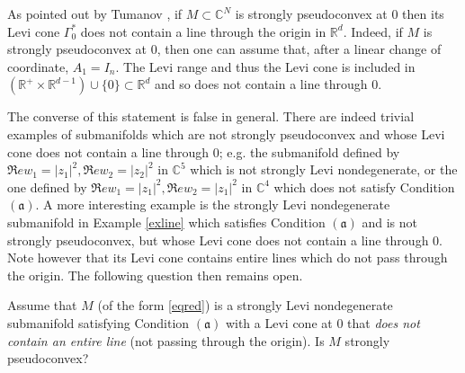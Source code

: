 \documentclass[10pt,a4paper]{amsart}
\newcommand{\C}{\mathbb C}
\newcommand{\R}{\mathbb R}
\newcommand{\transp}{\,^t}
\newcommand{\aaa}{\mathfrak{(a)}}
\newtheorem{remark}[theo]{Remark}
\numberwithin{equation}{section}
\begin{document}
As pointed out by Tumanov \cite{tu,tu2},  if $M \subset \C^N$ is strongly pseudoconvex at $0$ then its Levi cone $\Gamma^*_0$ does not contain a line through the origin in $\R^d$. Indeed, if  $M$ is strongly pseudoconvex at $0$, then one can assume that, after a linear change of coordinate, $A_1=I_n$. The Levi range and thus the Levi 
cone is included in $(\R^+\times \R^{d-1}) \cup \{0\} \subset \R^d$ and so does not contain a line through $0$. 

The converse of this statement is false in general. There are indeed trivial examples of submanifolds which are not strongly pseudoconvex and whose Levi cone does not contain a line through 0; e.g. the submanifold defined by $\Re e w_1=|z_1|^2, \Re e w_2=|z_2|^2$ in $\C^5$ which is  not strongly Levi nondegenerate, or  the one defined by $\Re e w_1=|z_1|^2, 
\Re e w_2=|z_1|^2$ in $\C^4$ which does not satisfy Condition $\aaa$. A more interesting example is the strongly Levi 
nondegenerate submanifold  in Example \ref{exline} which satisfies Condition $\aaa$ and is not strongly pseudoconvex, but whose Levi cone 
does not contain a line through $0$. Note however that its Levi cone contains entire lines which do not pass through the origin. 
The following question then remains open.

\vspace{0.1cm}

  Assume that $M$ (of the form \eqref{eqred}) is a strongly Levi nondegenerate submanifold satisfying Condition $\aaa$ with a Levi cone at $0$ that {\it does not contain an entire line} (not passing through the origin). Is $M$ strongly pseudoconvex?
%
%
%
%
%

%
\end{document}

